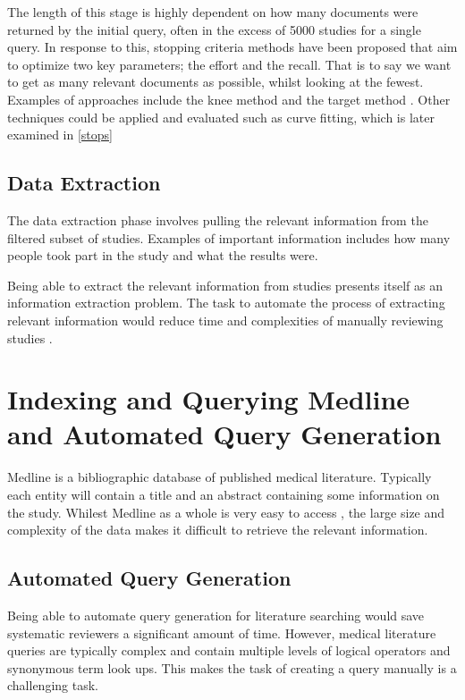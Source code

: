 The length of this stage is highly dependent on how many documents were returned by the initial query, often in the excess of 5000 studies for a single query. In response to this, stopping criteria methods have been proposed that aim to optimize two key parameters; the effort and the recall. That is to say we want to get as many relevant documents as possible, whilst looking at the fewest. Examples of approaches include the knee method \cite{Satopa11} and the target method \cite{Cormack2016}. Other techniques could be applied and evaluated such as curve fitting, which is later examined in \ref{stops}

\subsection{Data Extraction}

The data extraction phase involves pulling the relevant information from the filtered subset of studies. Examples of important information includes how many people took part in the study and what the results were.

Being able to extract the relevant information from studies presents itself as an information extraction problem. The task to automate the process of extracting relevant information would reduce time and complexities of manually reviewing studies \cite{Siddhartha2015}.



\iffalse
\section{Indexing and Querying Medline and Automated Query Generation} \label{medlinelit}

Medline is a bibliographic database of published medical literature. Typically each entity will contain a title and an abstract containing some information on the study. Whilest Medline as a whole is very easy to access \cite{medline}, the large size and complexity of the data makes it difficult to retrieve the relevant information.

\subsection{Automated Query Generation} \label{aqglit}

Being able to automate query generation for literature searching would save systematic reviewers a significant amount of time. However, medical literature queries are typically complex and contain multiple levels of logical operators and synonymous term look ups. This makes the task of creating a query manually is a challenging task.



